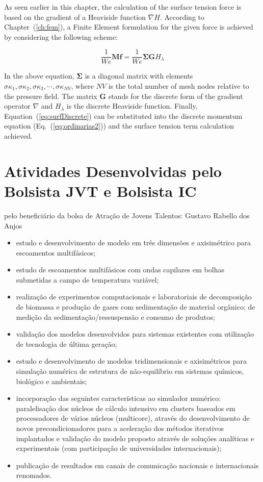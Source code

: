 \documentclass[a4paper,portuges]{article}
\newcommand{\fvet}{\mathbf{f}}
\begin{document}
As seen earlier in this chapter, the calculation of the surface tension
force is based on the gradient of a Heaviside function $\nabla H$.
According to Chapter~(\ref{ch:fem}), a Finite Element formulation for
the given force is achieved by considering the following scheme:


\begin{equation}
	\frac{1}{We}\mathbf{M} \fvet 
	= 
	\frac{1}{We} \mathbf{\Sigma} \mathbf{G} H_{\lambda}
	\label{eq:surfDiscrete}
\end{equation}

In the above equation, $\mathbf{\Sigma}$ is a diagonal matrix with
elements $\sigma \kappa_1, \sigma \kappa_2, \sigma \kappa_3,\cdots,
\sigma \kappa_{NV}$, where $NV$ is the total number of mesh nodes
relative to the pressure field. The matrix $\mathbf{G}$ stands for the
discrete form of the gradient operator $\nabla$ and $H_{\lambda}$ is the
discrete Heaviside function. Finally, Equation~(\ref{eq:surfDiscrete})
can be substituted into the discrete momentum equation
(Eq.~(\ref{eq:ordinarias2})) and the surface tension term calculation
achieved. 

\section{Atividades Desenvolvidas pelo Bolsista JVT e Bolsista IC}

pelo beneficiário da bolsa de Atração de Jovens Talentos: Gustavo Rabello
dos Anjos
\begin{itemize}
\item estudo e desenvolvimento de modelo em três dimensões e axisimétrico
para escoamentos multifásicos;
\item estudo de escoamentos multifásicos com ondas capilares em bolhas
submetidas a campo de temperatura variável;
\item realização de experimentos computacionais e laboratoriais de
decomposição de biomassa e produção de gases com sedimentação de
material orgânico; de medição da sedimentação/ressuspensão e consumo de
produtos;
\item validação dos modelos desenvolvidos para sistemas existentes com
utilização de tecnologia de última geração;
\item estudo e desenvolvimento de modelos tridimensionais e axisimétricos
para simulação numérica de estrutura de não-equilíbrio em sistemas
químicos, biológico e ambientais;
\item incorporação das seguintes características ao simulador numérico:
paralelisação dos núcleos de cálculo intensivo em clusters baseados em
processadores de vários núcleos (multicore), através do desenvolvimento
de novos precondicionadores para a aceleração dos métodos iterativos
implantados e validação do modelo proposto através de soluções
analíticas e experimentais (com participação de universidades
internacionais);
\item publicação de resultados em canais de comunicação nacionais e
internacionais renomados.
\end{itemize}
\end{document}
